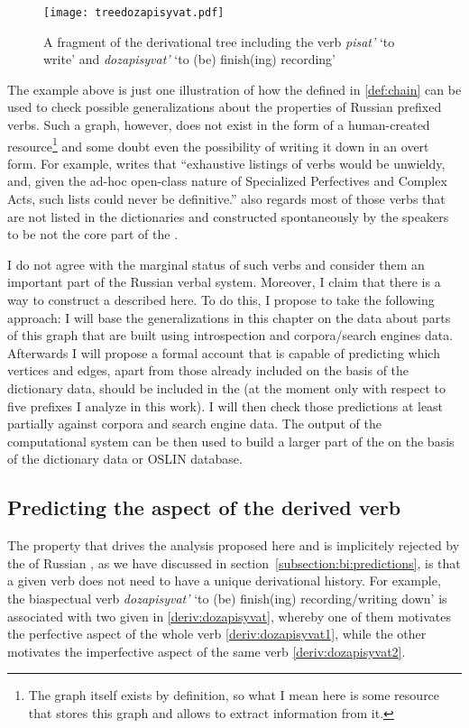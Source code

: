 \begin{figure}
\begin{center}
\texttt{[image: treedozapisyvat.pdf]}
\caption{A fragment of the derivational tree including the verb \textit{pisat'} `to write' and \textit{dozapisyvat'} `to (be) finish(ing) recording'\label{tree:dozapisyvat}}
\end{center}
\end{figure}			

The example above is just one illustration of how the  defined in \ref{def:chain} can be used to check possible generalizations about the properties of Russian prefixed verbs. Such a graph, however, does not exist in the form of a human-created resource\footnote{The graph itself exists by definition, so what I mean here is some resource that stores this graph and allows to extract information from it.} and some doubt even the possibility of writing it down in an overt form. For example, \citet[625]{Janda:07a} writes that ``exhaustive listings of verbs would be unwieldy, and, given the ad-hoc open-class nature of Specialized Perfectives and Complex Acts, such lists could never be definitive.'' \citet[626]{Janda:07a} also regards most of those verbs that are not listed in the dictionaries and constructed spontaneously by the speakers to be not the core part of the . 

I do not agree with the marginal status of such verbs and consider them an important part of the Russian verbal system. Moreover, I claim that there is a way to construct a  described here. To do this, I propose to take the following approach: I will base the generalizations in this chapter on the data about parts of this graph that are built using introspection and corpora/search engines data. Afterwards I will propose a formal account that is capable of predicting which vertices and edges, apart from those already included on the basis of the dictionary data, should be included in the  (at the moment only with respect to five prefixes I analyze in this work). I will then check those predictions at least partially against corpora and search engine data. The output of the computational system can be then used to build a larger part of the  on the basis of the dictionary data or OSLIN database.

\subsection{Predicting the aspect of the derived verb}
The property that drives the analysis proposed here and is implicitely rejected by the  of Russian , as we have discussed in section~\ref{subsection:bi:predictions}, is that a given verb does not need to have a unique derivational history. For example, the biaspectual verb \textit{dozapisyvat'} `to (be) finish(ing) recording/writing down' is associated with two  given in \ref{deriv:dozapisyvat}, whereby one of them motivates the perfective aspect of the whole verb \ref{deriv:dozapisyvat1}, while the other motivates the imperfective aspect of the same verb \ref{deriv:dozapisyvat2}.

